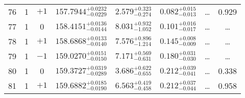 \begin{table*}[!]
\begin{tabular}{llcrrlrc}
76 & 1 & $+1$ & $    157.7944_{-      0.0229}^{+      0.0232}$ & $       2.579_{-       0.274}^{+       0.323}$ & $       0.082_{-       0.013}^{+       0.015}$ & \multicolumn{1}{c}{\dots} & 0.929\\[1pt]
77 & 1 & 0 & $    158.4151_{-      0.0144}^{+      0.0136}$ & $       8.031_{-       1.052}^{+       0.932}$ & $       0.101_{-       0.017}^{+       0.016}$ & \multicolumn{1}{c}{\dots} & \dots \\[1pt]
78 & 1 & $+1$ & $    158.6868_{-      0.0140}^{+      0.0133}$ & $       7.576_{-       1.214}^{+       0.896}$ & $       0.145_{-       0.009}^{+       0.008}$ & \multicolumn{1}{c}{\dots} & \dots \\[1pt]
79 & 1 & $-1$ & $    159.0270_{-      0.0150}^{+      0.0151}$ & $       7.171_{-       0.631}^{+       0.569}$ & $       0.180_{-       0.030}^{+       0.031}$ & \multicolumn{1}{c}{\dots} & \dots \\[1pt]
80 & 1 & 0 & $    159.3727_{-      0.0289}^{+      0.0319}$ & $       3.686_{-       0.655}^{+       0.622}$ & $       0.212_{-       0.041}^{+       0.039}$ & \multicolumn{1}{c}{\dots} & 0.338\\[1pt]
81 & 1 & $+1$ & $    159.6882_{-      0.0190}^{+      0.0185}$ & $       6.563_{-       0.458}^{+       0.419}$ & $       0.212_{-       0.044}^{+       0.037}$ & \multicolumn{1}{c}{\dots} & 0.958\\[1pt]
\hline
\end{tabular}
\end{table*}


